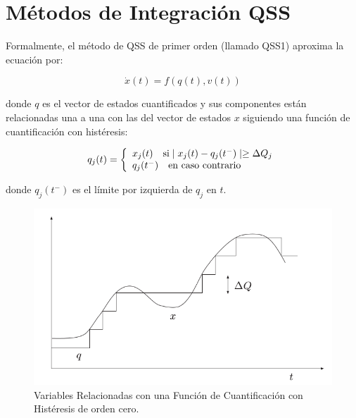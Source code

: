 \documentclass{beamer}
\begin{document}
\section{Métodos de Integración QSS}
\begin{frame}
	Formalmente, el método de QSS de primer orden (llamado QSS1) aproxima la ecuación por:
	
	\begin{equation}
	\dot{x}(t) = f (q(t), v(t))
	\end{equation}
	
	donde $q$ es el vector de estados cuantificados y sus componentes están relacionadas una a una con las del vector de estados $x$ siguiendo una 
	función de cuantificación con histéresis:
	
	\begin{equation}
	q_j(t) = \left\{ 
	  \begin{array}{l l}
	    x_j(t)  \quad \text{si} \mid x_j (t ) - q_j (t^{-} ) \mid \geq \Delta Q_j \\
	    q_j (t^{-} ) \quad \text{en caso contrario}
	  \end{array} \right.
	\end{equation}
	
	donde $q_j (t^{-})$ es el límite por izquierda de $q_j$ en $t$.
\end{frame}

\begin{frame}
	\begin{figure}[H]
	  \includegraphics[scale=0.5]{histeresis1}
	  \caption{Variables Relacionadas con una Función de Cuantificación con Histéresis de orden cero.} \label{fig:fig2-2}
	\end{figure}
\end{frame}
\end{document}
